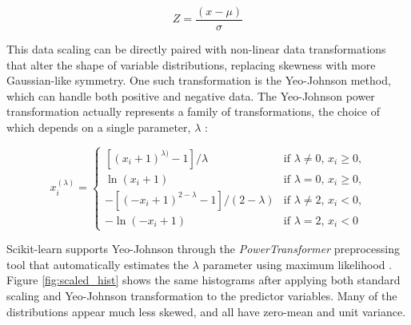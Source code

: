 \begin{equation}
    Z = \frac{(x - \mu)}{\sigma}
\end{equation}

This data scaling can be directly paired with non-linear data transformations that alter the shape of variable distributions, replacing skewness with more Gaussian-like symmetry. One such transformation is the Yeo-Johnson method, which can handle both positive and negative data. The Yeo-Johnson power transformation actually represents a family of transformations, the choice of which depends on a single parameter, $\lambda$ \citep{yeo_new_2000}:

\begin{equation}
    x_i^{(\lambda)} = 
    \begin{cases}
      [(x_i + 1)^{\lambda)}-1]/\lambda & \text{if $\lambda \neq 0$, $x_i \geq 0$,}\\
      \ln{(x_i + 1)} & \text{if $\lambda = 0$, $x_i \geq 0$,}\\
      -[(-x_i + 1)^{2-\lambda}-1]/(2-\lambda) & \text{if $\lambda \neq 2$, $x_i < 0$,}\\
      -\ln{(-x_i + 1)} & \text{if $\lambda = 2$, $x_i < 0$}
    \end{cases}  
\end{equation}

Scikit-learn supports Yeo-Johnson through the \textit{PowerTransformer} preprocessing tool that automatically estimates the $\lambda$ parameter using maximum likelihood \citep{scikit-learn_sklearnpreprocessingpowertransformer_2021}. Figure \ref{fig:scaled_hist} shows the same histograms after applying both standard scaling and Yeo-Johnson transformation to the predictor variables. Many of the distributions appear much less skewed, and all have zero-mean and unit variance.

